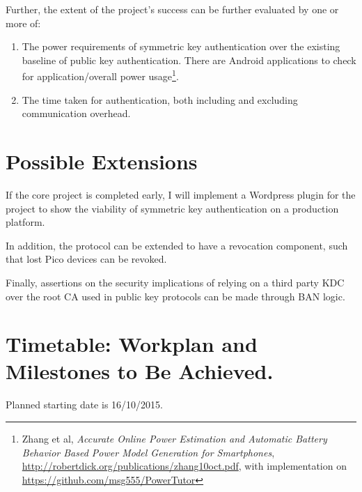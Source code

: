 \documentclass[12pt,a4paper,twoside]{article}
\begin{document}
Further, the extent of the project’s success can be further evaluated by one or more of:

\begin{enumerate}
	
\item The power requirements of symmetric key authentication over the existing baseline of public key authentication. There are Android applications to check for application/overall power usage\footnote{Zhang et al, \textit{Accurate Online Power Estimation and Automatic Battery Behavior Based Power Model Generation for Smartphones}, \url{http://robertdick.org/publications/zhang10oct.pdf}, with implementation on \url{https://github.com/msg555/PowerTutor}}.

\item The time taken for authentication, both including and excluding communication overhead.
	
\end{enumerate}


\section*{Possible Extensions}

If the core project is completed early, I will implement a Wordpress plugin for the project to show the viability of symmetric key authentication on a production platform.

In addition, the protocol can be extended to have a revocation component, such that lost Pico devices can be revoked.

Finally, assertions on the security implications of relying on a third party KDC over the root CA used in public key protocols can be made through BAN logic.


\section*{Timetable: Workplan and Milestones to Be Achieved.}

Planned starting date is 16/10/2015.
\end{document}
